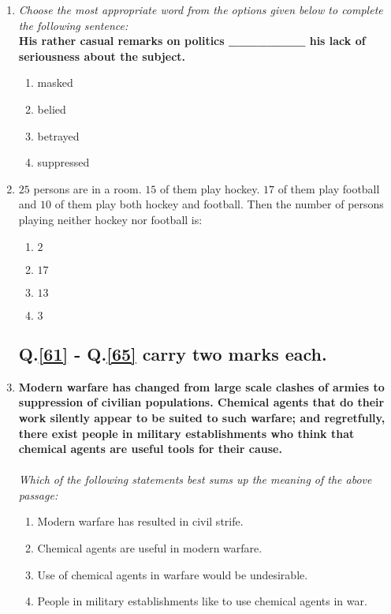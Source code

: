 \documentclass[journal]{IEEEtran}
\begin{document}
\begin{enumerate}
            \item \textit{Choose the most appropriate word from the options given below to complete the following sentence:} \\
            \textbf{His rather casual remarks on politics \_\_\_\_\_\_\_\_ his lack of seriousness about the subject.}
            \begin{enumerate}
                \item masked
                \item belied
                \item betrayed
                \item suppressed
            \end{enumerate}

            \item \label{60}$25$ persons are in a room. $15$ of them play hockey. $17$ of them play football and $10$ of them play both hockey and football. Then the number of persons playing neither hockey nor football is:
            \begin{enumerate}
                \item $2$
                \item $17$
                \item $13$
                \item $3$
            \end{enumerate}

    \subsection*{Q.\ref{61} - Q.\ref{65} carry two marks each.}

    \item \label{61}\textbf{Modern warfare has changed from large scale clashes of armies to suppression of civilian populations. Chemical agents that do their work silently appear to be suited to such warfare; and regretfully, there exist people in military establishments who think that chemical agents are useful tools for their cause.} \\ \\
    \textit{Which of the following statements best sums up the meaning of the above passage:}
    \begin{enumerate}
        \item Modern warfare has resulted in civil strife.
        \item Chemical agents are useful in modern warfare.
        \item Use of chemical agents in warfare would be undesirable.
        \item People in military establishments like to use chemical agents in war.
    \end{enumerate}


\end{enumerate}
\end{document}
